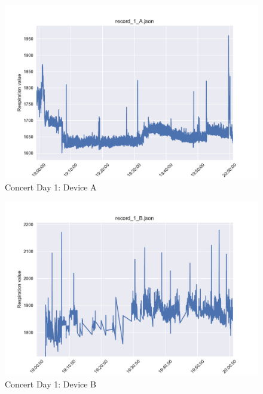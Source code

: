 \begin{figure}
    \centering
    \includegraphics[scale=0.6]{images/record_1_a.pdf}
    \caption{Concert Day 1: Device A}
    \label{fig:concert_day1_a}
\end{figure}

\begin{figure}
    \centering
    \includegraphics[scale=0.6]{images/record_1_b.pdf}
    \caption{Concert Day 1: Device B}
    \label{fig:concert_day1_b}
\end{figure}

